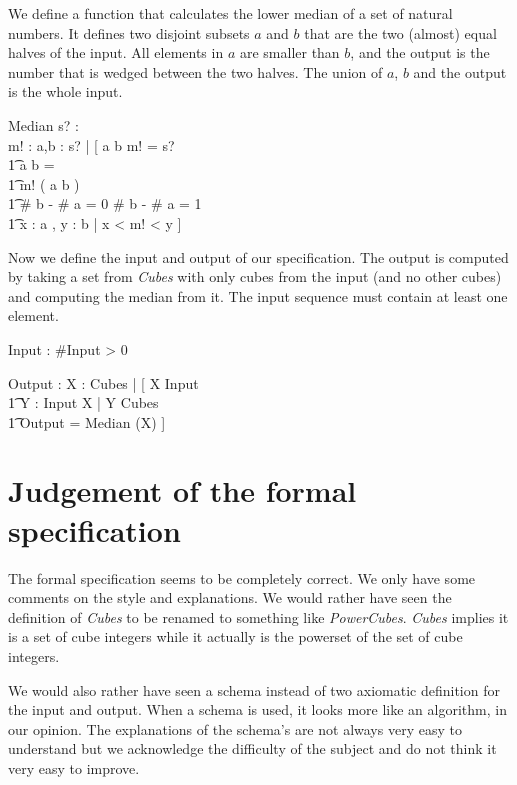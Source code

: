 \documentclass[12pt]{article}
\begin{document}
We define a function that calculates the lower median of a set of natural numbers. It defines two disjoint subsets $a$ and $b$ that are the two (almost) equal halves of the input. All elements in $a$ are smaller than $b$, and the output is the number that is wedged between the two halves. The union of $a$, $b$ and the output is the whole input.
\begin{schema}{Median}
s? : \power \nat \\
m! : \nat
\where
\exists a,b : \power s? | [ \: a \union b \union m! = s? \\
                          \t1 a \cap b = \emptyset \\
                          \t1 m! \notin ( a \union b ) \\
                          \t1 \# b - \# a = 0 \: \vee \# b - \# a = 1 \\
                          \t1 \forall x : a , y : b | x < m! < y \: ]
\end{schema}

Now we define the input and output of our specification. The output is computed by taking a set from \textsl{Cubes} with only cubes from the input (and no other cubes) and computing the median from it. The input sequence must contain at least one element.
\begin{axdef}
Input : \seq \nat
\where
\#Input > 0
\end{axdef}

\begin{axdef}
Output : \nat
\where
\exists X : Cubes | [ \: X \subseteq \ran Input \\ \t1 \forall Y : \ran Input \setminus X | Y \not\subseteq Cubes \\ \t1 Output = Median (X) \: ]
\end{axdef}

\section{Judgement of the formal specification}
The formal specification seems to be completely correct. We only have some comments on the style and explanations. We would rather have seen the definition of \textsl{Cubes} to be renamed to something like \textsl{PowerCubes}. \textsl{Cubes} implies it is a set of cube integers while it actually is the powerset of the set of cube integers.

We would also rather have seen a schema instead of two axiomatic definition for the input and output. When a schema is used, it looks more like an algorithm, in our opinion. The explanations of the schema's are not always very easy to understand but we acknowledge the difficulty of the subject and do not think it very easy to improve.
\end{document}
